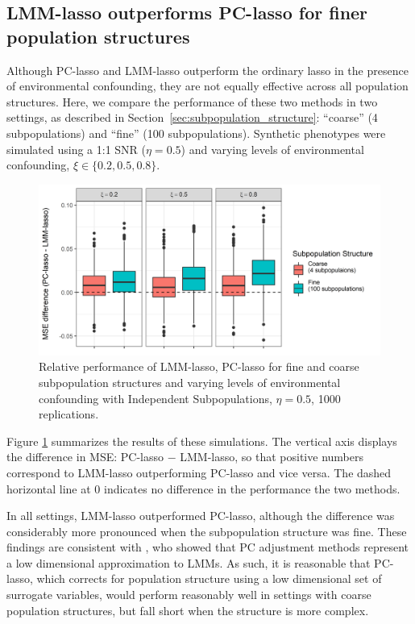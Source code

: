 \subsection{LMM-lasso outperforms PC-lasso for finer population structures}
\label{sec:sim-fine-coarse}

Although PC-lasso and LMM-lasso outperform the ordinary lasso in the presence of environmental confounding, they are not equally effective across all population structures.  Here, we compare the performance of these two methods in two settings, as described in Section~\ref{sec:subpopulation_structure}: ``coarse'' (4 subpopulations) and ``fine'' (100 subpopulations).  Synthetic phenotypes were simulated using a 1:1 SNR ($\eta = 0.5$) and varying levels of environmental confounding, $\xi \in \{0.2, 0.5,0.8\}$. 

\begin{figure}[H]
    \centering
    \includegraphics[scale = 0.9]{figures/figure_03.png}
    \caption{Relative performance of LMM-lasso, PC-lasso for fine and coarse subpopulation structures and varying levels of environmental confounding with Independent Subpopulations, $\eta = 0.5$, 1000 replications.}
    \label{fig:big_vs_small}
\end{figure}

Figure \ref{fig:big_vs_small} summarizes the results of these simulations. The vertical axis displays the difference in MSE: PC-lasso $-$ LMM-lasso, so that positive numbers correspond to LMM-lasso outperforming PC-lasso and vice versa. The dashed horizontal line at 0 indicates no difference in the performance the two methods.

In all settings, LMM-lasso outperformed PC-lasso, although the difference was considerably more pronounced when the subpopulation structure was fine.  These findings are consistent with \citet{hoffman2013correcting}, who showed that PC adjustment methods represent a low dimensional approximation to LMMs. As such, it is reasonable that PC-lasso, which corrects for population structure using a low dimensional set of surrogate variables, would perform reasonably well in settings with coarse population structures, but fall short when the structure is more complex.


